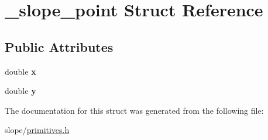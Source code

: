 \hypertarget{struct__slope__point}{\section{\+\_\+slope\+\_\+point Struct Reference}
\label{struct__slope__point}
}
\subsection*{Public Attributes}
\begin{DoxyCompactItemize}
\item 
\hypertarget{struct__slope__point_a75e2ad1b976a451b7eabebce220a9718}{double {\bfseries x}}\label{struct__slope__point_a75e2ad1b976a451b7eabebce220a9718}

\item 
\hypertarget{struct__slope__point_a2dc7b075530ba3e2a8add8c0e03ace8c}{double {\bfseries y}}\label{struct__slope__point_a2dc7b075530ba3e2a8add8c0e03ace8c}

\end{DoxyCompactItemize}


The documentation for this struct was generated from the following file\+:\begin{DoxyCompactItemize}
\item 
slope/\hyperlink{primitives_8h}{primitives.\+h}\end{DoxyCompactItemize}
